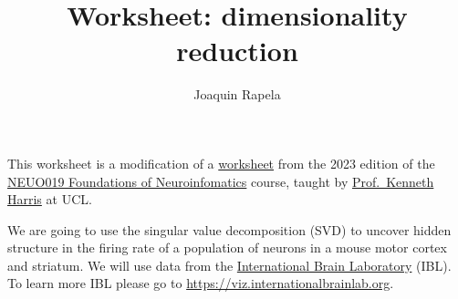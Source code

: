 \documentclass[12pt]{article}
\title{Worksheet: dimensionality reduction}
\author{Joaquin Rapela}
\begin{document}
\maketitle

This worksheet is a modification of a
\href{https://drive.google.com/file/d/1r90rlJpFKilQmNj1h27gmZdyi-RJeCq_/view}{worksheet}
from the 2023 edition of the
\href{https://www.ucl.ac.uk/cortexlab/neuroinformatics-class-page}{NEUO019
Foundations of Neuroinfomatics} course, taught by
\href{https://profiles.ucl.ac.uk/31489}{Prof.~Kenneth Harris} at UCL.

We are going to use the singular value decomposition (SVD) to uncover hidden
structure in the firing rate of a population of neurons in a mouse motor cortex
and striatum.
%
We will use data from the
\href{https://www.internationalbrainlab.com/}{International Brain Laboratory}
(IBL). To learn more IBL please go to \url{https://viz.internationalbrainlab.org}.
\end{document}
